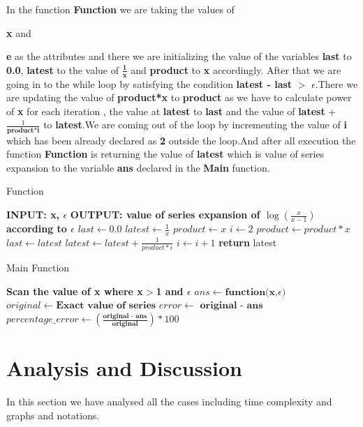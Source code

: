 \documentclass[conference]{IEEEtran}
\begin{document}
In the function \textbf{Function} we are taking the values of {\textbf{x} and {\textbf{e} as the attributes and there we are initializing the value of the variables \textbf{last} to \textbf{0.0}, \textbf{latest} to the value of $\frac{\textbf{1}}{\textbf{x}}$ and \textbf{product} to \textbf{x} accordingly. After that we are going in to the while loop by satisfying the condition \textbf{latest - last} $>$ $\epsilon$.There we are updating the value of \textbf{product*x} to \textbf{product} as we have to calculate power of \textbf{x} for each iteration , the value at \textbf{latest} to \textbf{last} and the value of \textbf{latest} + $\frac{1}{\textbf{product*i}}$ to \textbf{latest}.We are coming out of the loop by incrementing the value of \textbf{i} which has been already declared as \textbf{2} outside the loop.And after all execution the function \textbf{Function} is returning the value of \textbf{latest} which is value of series expansion to the variable \textbf{ans} declared in the \textbf{Main} function.

\begin{algorithm}[H]
\caption{Function}
\end{algorithm}
\begin{algorithmic}[1]
\STATE \textbf{INPUT: x, $\epsilon$}
\STATE \textbf{OUTPUT: value of series expansion of $\log{\left(\frac{x}{x-1}\right)}$ according to $\epsilon$}
\STATE $ last \gets 0.0 $
\STATE $  latest \gets \frac{1}{x}$
\STATE $ product \gets x $
\STATE $ i \gets 2$ 
	\STATE $product \gets product*x$
    \STATE $ last \gets  latest $
    \STATE $ latest \gets latest + \frac{1}{product*i}$
    \STATE $ i \gets i+1$
\ENDWHILE
\STATE \textbf{return} latest  
\end{algorithmic}


\begin{algorithm}[H]
\caption{Main Function}
\end{algorithm}
\begin{algorithmic}[1]
\STATE \textbf{Scan the value of x where x$>$1 and $\epsilon$}
\STATE $ ans \gets \textbf{function(x,$\epsilon$)} $
\STATE $ original \gets \textbf{Exact value of series} $
\STATE $ error \gets \textbf{ original - ans} $
\STATE $ percentage\_error \gets 
\left(\frac{\textbf{original - ans}}{\textbf{original}}\right)*100$
\end{algorithmic}


\section{\textbf{Analysis and Discussion}}
In this section we have analysed all the cases including  time complexity and  graphs and notations.
}}
\end{document}
